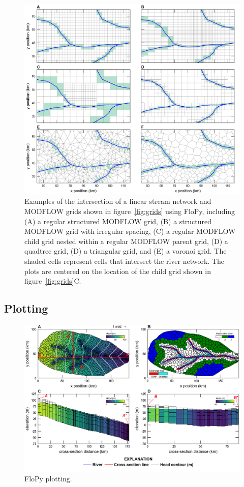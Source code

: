 \documentclass[11pt, oneside]{article}   	%
\begin{document}
\begin{figure}[h]
	\begin{center}
		\includegraphics{figures/grids_intersection.png}
	\end{center}
	\caption{Examples of the intersection of a linear stream network and MODFLOW grids shown in figure~\ref{fig:grids} using FloPy, including (A) a regular structured MODFLOW grid, (B) a structured MODFLOW grid with irregular spacing, (C) a regular MODFLOW child grid nested within a regular MODFLOW parent grid, (D) a quadtree grid, (D) a triangular grid, and (E) a voronoi grid. The shaded cells represent cells that intersect the river network. The plots are centered on the location of the child grid shown in figure~\ref{fig:grids}C.}
	\label{fig:intersections}
\end{figure}


\subsection{Plotting}

\begin{figure}[h]
	\begin{center}
		\includegraphics{figures/grids_flopy_plots.png}
	\end{center}
	\caption{FloPy plotting.}
	\label{fig:flopyplots}
\end{figure}
\end{document}
